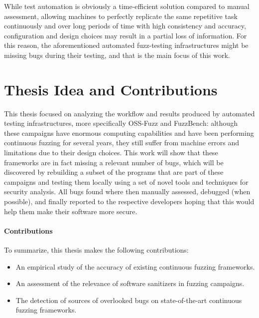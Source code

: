 While test automation is obviously a time-efficient solution compared to manual assessment, allowing machines to perfectly replicate the same repetitive task continuously and over long periods of time with high consistency and accuracy, configuration and design choices may result in a partial loss of information. For this reason, the aforementioned automated fuzz-testing infrastructures might be missing bugs during their testing, and that is the main focus of this work.  




\section{Thesis Idea and Contributions}
This thesis focused on analyzing the workflow and results produced by automated testing infrastructures, more specifically OSS-Fuzz and FuzzBench: although these campaigns have enormous computing capabilities and have been performing continuous fuzzing for several years, they still suffer from machine errors and limitations due to their design choices. This work will show that these frameworks are in fact missing a relevant number of bugs, which will be discovered by rebuilding a subset of the programs that are part of these campaigns and testing them locally using a set of novel tools and techniques for security analysis. All bugs found where then manually assessed, debugged (when possible), and finally reported to the respective developers hoping that this would help them make their software more secure.


\paragraph{Contributions}
To summarize, this thesis makes the following contributions:
\begin{itemize}
    \item An empirical study of the accuracy of existing continuous fuzzing frameworks.
    \item An assessment of the relevance of software sanitizers in fuzzing campaigns.
    \item The detection of sources of overlooked bugs on state-of-the-art continuous fuzzing frameworks.
\end{itemize}




